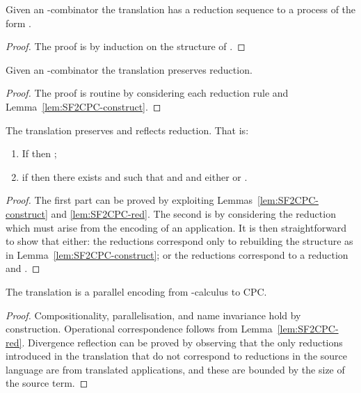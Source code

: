\documentclass{llncs}
\begin{document}
\begin{lemma}
\label{lem:SF2CPC-construct}
Given an -combinator  the translation  has a reduction sequence to a process of the form .
\end{lemma}
\begin{proof}
The proof is by induction on the structure of .
\end{proof}


\begin{lemma}
\label{lem:SF2CPC-red}
Given an -combinator  the translation  preserves reduction.
\end{lemma}
\begin{proof}
The proof is routine 
by considering each reduction rule and Lemma~\ref{lem:SF2CPC-construct}.
\end{proof}

\begin{lemma}
\label{lem:sf2cpc-red}
The translation  preserves and reflects reduction. That is:
\begin{enumerate}
\item If  then ;
\item if  then there exists  and  such that
       and  and either  or .
\end{enumerate}
\end{lemma}
\begin{proof}
The first part can be proved by exploiting Lemmas~\ref{lem:SF2CPC-construct} and \ref{lem:SF2CPC-red}.
The second is by considering the reduction  which must arise
from the encoding of an application.
It is then straightforward to show that either:
the reductions  correspond only to rebuilding the structure as in
Lemma~\ref{lem:SF2CPC-construct}; or
the reductions correspond to a reduction  and .
\end{proof}


\begin{theorem}
\label{thm:SF2CPC}
The translation  is a parallel encoding from -calculus to CPC.
\end{theorem}
\begin{proof}
Compositionality, parallelisation, and name invariance hold by construction.
Operational correspondence follows from Lemma~\ref{lem:SF2CPC-red}.
Divergence reflection can be proved by observing that the only reductions introduced
in the translation that do not correspond to reductions in the source language are
from translated applications, and these are bounded by the size of the source term.
\end{proof}
\end{document}
